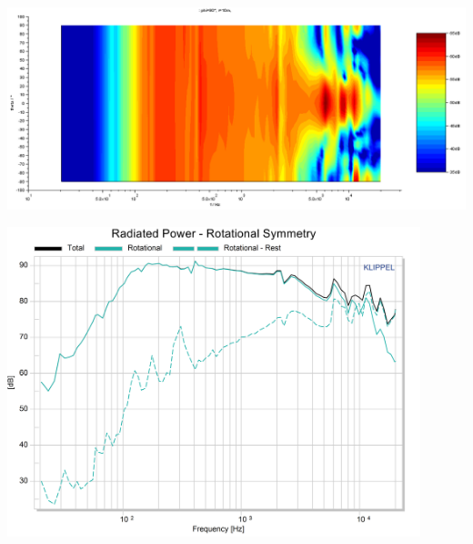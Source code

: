 \documentclass{report}
\begin{document}
\begin{appendices}
\begin{minipage}{0.5\textwidth}
\begin{center}
	\includegraphics[width=.9\textwidth]{Sym/contour} 
    \captionsetup{hypcap=false} 
	\label{fig:contour_10cm}
\end{center}
\end{minipage}
\begin{minipage}{0.5\textwidth}
\begin{center}
	\includegraphics[width=0.9\textwidth]{Sym/10cm_RadPow_Rot}
    \captionsetup{hypcap=false}
\end{center}
\end{minipage}


\end{appendices}
\end{document}
